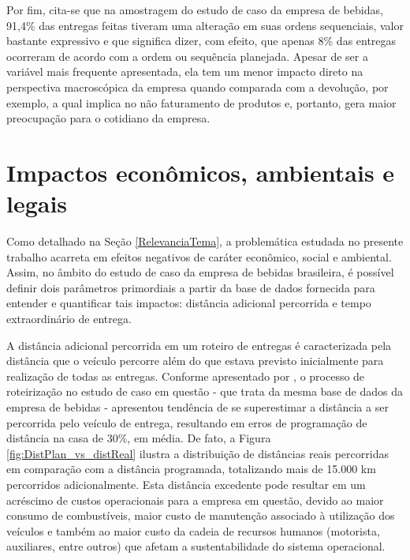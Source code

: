 Por fim, cita-se que na amostragem do estudo de caso da empresa de bebidas, 91,4\% das entregas feitas tiveram uma alteração em suas ordens sequenciais, valor bastante expressivo e que significa dizer, com efeito, que apenas 8\% das entregas ocorreram de acordo com a ordem ou sequência planejada. Apesar de ser a variável mais frequente apresentada, ela tem um menor impacto direto na perspectiva macroscópica da empresa quando comparada com a devolução, por exemplo, a qual implica no não faturamento de produtos e, portanto, gera maior preocupação para o cotidiano da empresa. 

\section{Impactos econômicos, ambientais e legais} \label{sec:impactoAmbev}

Como detalhado na Seção \ref{RelevanciaTema}, a problemática estudada no presente trabalho acarreta em efeitos negativos de caráter econômico, social e ambiental. Assim, no âmbito do estudo de caso da empresa de bebidas brasileira, é possível definir dois parâmetros primordiais a partir da base de dados fornecida para entender e quantificar tais impactos: distância adicional percorrida e tempo extraordinário de entrega.

A distância adicional percorrida em um roteiro de entregas é caracterizada pela distância que o veículo percorre além do que estava previsto inicialmente para realização de todas as entregas. 
Conforme apresentado por , o processo de roteirização no estudo de caso em questão - que trata da mesma base de dados da empresa de bebidas - apresentou tendência de se superestimar a distância a ser percorrida pelo veículo de entrega, resultando em erros de programação de distância na casa de 30\%, em média.
De fato, a Figura \ref{fig:DistPlan_vs_distReal} ilustra a distribuição de distâncias reais percorridas em comparação com a distância programada, totalizando mais de 15.000 km percorridos adicionalmente.
Esta distância excedente pode resultar em um acréscimo de custos operacionais para a empresa em questão, devido ao maior consumo de combustíveis, maior custo de manutenção associado à utilização dos veículos e também ao maior custo da cadeia de recursos humanos (motorista, auxiliares, entre outros) que afetam a sustentabilidade do sistema operacional.

